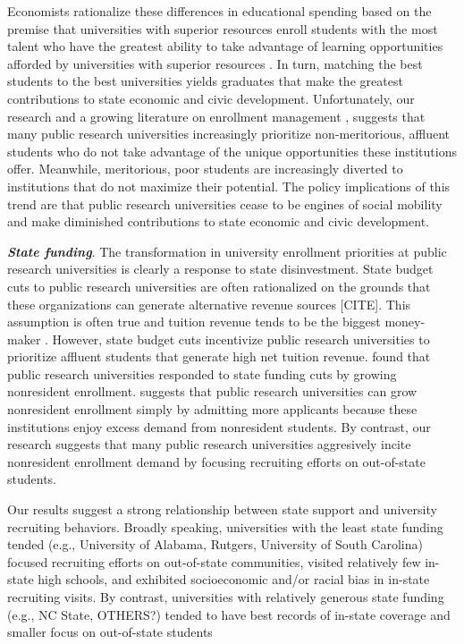 \documentclass[twoside]{article}
\begin{document}
Economists rationalize these differences in educational spending based on the premise that universities with superior resources enroll students with the most talent who have the greatest ability to take advantage of learning opportunities afforded by universities with superior resources \citep{RN1549,RN2247,RN2402}. In turn, matching the best students to the best universities yields graduates that make the greatest contributions to state economic and civic development.  Unfortunately, our research and a growing literature on enrollment management \citep[e.g., ][]{RN3685,RN3528,RN4409,RN4032}, suggests that many public research universities increasingly prioritize non-meritorious, affluent students who do not take advantage of the unique opportunities these institutions offer. Meanwhile, meritorious, poor students are increasingly diverted to institutions that do not maximize their potential. The policy implications of this trend are that public research universities cease to be engines of social mobility and make diminished contributions to state economic and civic development.

\textbf{\textit{State funding}}. The transformation in university enrollment priorities at public research universities is clearly a response to state disinvestment.  State budget cuts to public research universities are often rationalized on the grounds that these organizations can generate alternative revenue sources [CITE]. This assumption is often true and tuition revenue tends to be the biggest money-maker \citep{RN4247}. However, state budget cuts incentivize public research universities to prioritize affluent students that generate high net tuition revenue.  \cite{RN3753} found that public research universities responded to state funding cuts by growing nonresident enrollment. \cite{RN2535} suggests that public research universities can grow nonresident enrollment simply by admitting more applicants because these institutions enjoy excess demand from nonresident students. By contrast, our research suggests that many public research universities aggresively incite nonresident enrollment demand by focusing recruiting efforts on out-of-state students.

Our results suggest a strong relationship between state support and university recruiting behaviors.  Broadly speaking, universities with the least state funding tended (e.g., University of Alabama, Rutgers, University of South Carolina) focused recruiting efforts on out-of-state communities, visited relatively few in-state high schools, and exhibited socioeconomic and/or racial bias in in-state recruiting visits.  By contrast, universities with relatively generous state funding (e.g., NC State, OTHERS?) tended to have best records of in-state coverage and smaller focus on out-of-state students
\end{document}
